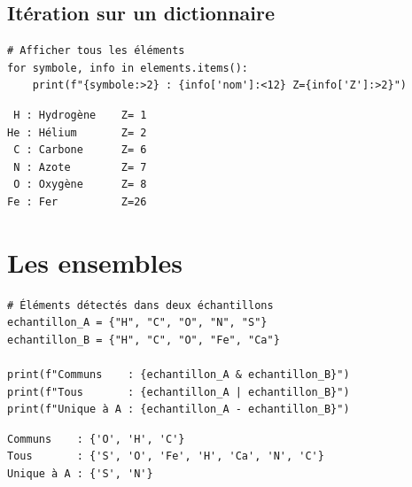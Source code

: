 \subsection{It\'eration sur un dictionnaire}

\begin{codeblock}[title=\textbf{Python}]
\begin{verbatim}
# Afficher tous les éléments
for symbole, info in elements.items():
    print(f"{symbole:>2} : {info['nom']:<12} Z={info['Z']:>2}")
\end{verbatim}
\end{codeblock}

\begin{codeoutput}
\begin{verbatim}
 H : Hydrogène    Z= 1
He : Hélium       Z= 2
 C : Carbone      Z= 6
 N : Azote        Z= 7
 O : Oxygène      Z= 8
Fe : Fer          Z=26
\end{verbatim}
\end{codeoutput}

\section{Les ensembles}

\begin{codeblock}[title=\textbf{Python}]
\begin{verbatim}
# Éléments détectés dans deux échantillons
echantillon_A = {"H", "C", "O", "N", "S"}
echantillon_B = {"H", "C", "O", "Fe", "Ca"}

print(f"Communs    : {echantillon_A & echantillon_B}")
print(f"Tous       : {echantillon_A | echantillon_B}")
print(f"Unique à A : {echantillon_A - echantillon_B}")
\end{verbatim}
\end{codeblock}

\begin{codeoutput}
\begin{verbatim}
Communs    : {'O', 'H', 'C'}
Tous       : {'S', 'O', 'Fe', 'H', 'Ca', 'N', 'C'}
Unique à A : {'S', 'N'}
\end{verbatim}
\end{codeoutput}

